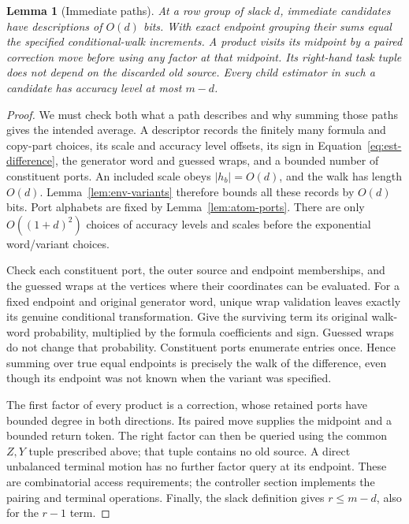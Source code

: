 \documentclass[11pt]{article}
\numberwithin{equation}{section}
\newtheorem{lemma}[theorem]{Lemma}
\theoremstyle{definition}
\theoremstyle{remark}
\begin{document}
\begin{lemma}[Immediate paths]\label{lem:est-paths}
At a row group of slack $d$, immediate candidates have descriptions of
$O(d)$ bits.  With exact endpoint grouping their sums equal the specified
conditional-walk increments.  A product visits its midpoint by a paired
correction move before using any factor at that midpoint.  Its right-hand
task tuple does not depend on the discarded old source.  Every child
estimator in such a candidate has accuracy level at most ${m}-d$.
\end{lemma}
\begin{proof}
We must check both what a path describes and why summing those paths gives the intended average. A descriptor records the finitely many formula and copy-part choices, its
scale and accuracy level offsets, its sign in Equation~\eqref{eq:est-difference},
the generator word and guessed wraps, and a bounded number of constituent
ports.  An included scale obeys $|h_b|=O(d)$, and the walk has length
$O(d)$.  Lemma~\ref{lem:env-variants} therefore bounds all these records by
$O(d)$ bits.  Port alphabets are fixed by Lemma~\ref{lem:atom-ports}.
There are only $O((1+d)^2)$ choices of accuracy levels and scales before the
exponential word/variant choices.

Check each constituent port, the outer source and endpoint memberships,
and the guessed wraps at the vertices where their coordinates can be
evaluated.  For a fixed endpoint and original generator word, unique wrap
validation leaves exactly its genuine conditional transformation.
Give the surviving term its original walk-word probability, multiplied
by the formula coefficients and sign.  Guessed wraps do not change that
probability.  Constituent ports enumerate entries once.  Hence summing
over true equal endpoints is precisely the walk of the difference, even
though its endpoint was not known when the variant was specified.

The first factor of every product is a correction, whose retained ports
have bounded degree in both directions.  Its paired move supplies the
midpoint and a bounded return token.  The right factor can then be queried
using the common $Z,Y$ tuple prescribed above; that tuple contains no old
source.  A direct unbalanced terminal motion has no further factor query
at its endpoint.  These are combinatorial access requirements; the
controller section implements the pairing and terminal operations.
Finally, the slack definition gives ${r}\le {m}-d$, also for the ${r}-1$ term.
\end{proof}
\end{document}
